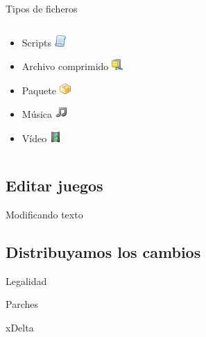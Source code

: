 \begin{frame}{Tipos de ficheros}
\begin{columns}
\begin{column}{0.5\textwidth}
\begin{itemize}
            \item Scripts \includegraphics{imgs/script.png}
            \item Archivo comprimido \includegraphics{imgs/compress.png}
            \item Paquete \includegraphics{imgs/package.png}
            \item Música \includegraphics{imgs/music.png}
            \item Vídeo \includegraphics{imgs/film.png}
        \end{itemize}
    \end{column}
    \end{columns}
\end{frame}

\subsection{Editar juegos}
\begin{frame}{Modificando texto}
\end{frame}

\subsection{Distribuyamos los cambios}
\begin{frame}{Legalidad}
\end{frame}

\begin{frame}{Parches}
\end{frame}

\begin{frame}{xDelta}
\end{frame}
